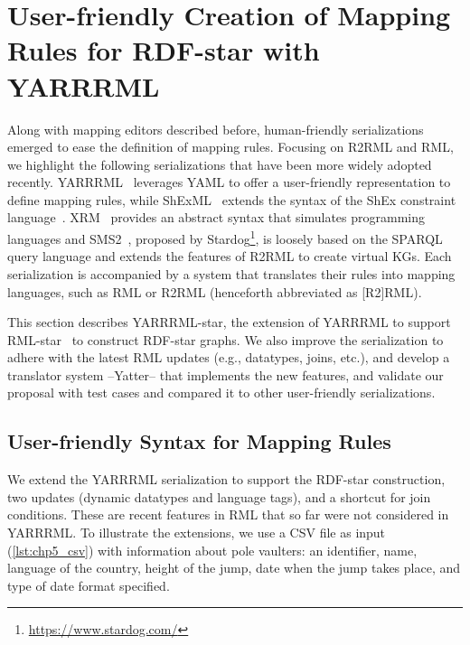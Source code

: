 \section{User-friendly Creation of Mapping Rules for RDF-star with YARRRML}
\label{sec:chp5_yarrrml_star}

Along with mapping editors described before, human-friendly serializations emerged 
to ease the definition of mapping rules. Focusing on R2RML and RML, we highlight the following serializations that have been more widely adopted recently.
YARRRML~\parencite{Heyvaert2018yarrrml} leverages YAML
to offer a user-friendly representation to define mapping rules, while
ShExML~\parencite{Garcia-Gonzalez2020shexml} extends the syntax of the ShEx constraint language~\parencite{prud2014shex}.
XRM~\parencite{xrm}
provides an abstract syntax that simulates programming languages and 
SMS2~\parencite{sms2}, proposed by Stardog\footnote{\label{foot:stardog}\url{https://www.stardog.com/}}, is loosely based on the SPARQL query language and extends the features of R2RML to create virtual KGs.
Each serialization is accompanied by a system that translates their rules into mapping languages, such as RML or R2RML (henceforth abbreviated as [R2]RML). 

This section describes YARRRML-star, the extension of YARRRML to support RML-star~\parencite{delva2021rml-star} to construct RDF-star graphs.
We also improve the serialization to adhere with the latest RML updates
(e.g., datatypes, joins, etc.), and develop a translator system --Yatter-- that implements the new features, and validate our proposal with test cases and compared it to other user-friendly serializations.

\subsection{User-friendly Syntax for Mapping Rules}
\label{sec:chp5_yarrrml-desc}
We extend the YARRRML serialization to support the RDF-star construction, two updates (dynamic datatypes and language tags), and a shortcut for join conditions. These are recent features in RML that so far were not considered in YARRRML.
To illustrate the extensions,
we use a CSV file as input (\cref{lst:chp5_csv}) with information about pole vaulters: an identifier, name, language of the country, height of the jump, date when the jump takes place, and type of date format specified.

